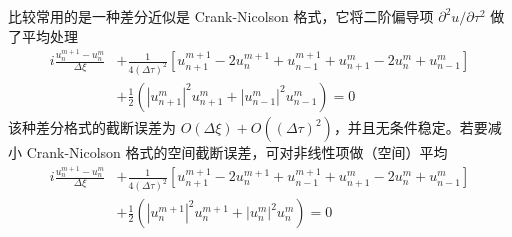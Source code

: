 比较常用的是一种差分近似是 Crank-Nicolson 格式，它将二阶偏导项 $\partial^2 u/\partial \tau^2$ 做了平均处理\cite{Greig,Taha}
\begin{equation}
    \begin{aligned}
        i\frac{u_n^{m+1}-u_n^m}{\Delta\xi}&+\frac{1}{4(\Delta\tau)^2}\left[u_{n+1}^{m+1}-2u_n^{m+1}+u_{n-1}^{m+1}+u_{n+1}^{m}-2u_n^{m}+u_{n-1}^{m}\right]\\
        &+\frac{1}{2}\left(|u_{n+1}^m|^2u_{n+1}^m+|u_{n-1}^m|^2u_{n-1}^m\right)=0
    \end{aligned}
\end{equation}
该种差分格式的截断误差为 $O(\Delta\xi)+O((\Delta\tau)^2)$，并且无条件稳定。若要减小 Crank-Nicolson 格式的空间截断误差，可对非线性项做（空间）平均
\begin{equation}
    \begin{aligned}
        i\frac{u_n^{m+1}-u_n^m}{\Delta\xi}&+\frac{1}{4(\Delta\tau)^2}\left[u_{n+1}^{m+1}-2u_n^{m+1}+u_{n-1}^{m+1}+u_{n+1}^{m}-2u_n^{m}+u_{n-1}^{m}\right]\\
        &+\frac{1}{2}\left(|u_n^{m+1}|^2u_n^{m+1}+|u_n^m|^2u_n^m\right)=0
    \end{aligned}
    \label{eq:Crank-Nicolson}
\end{equation}

